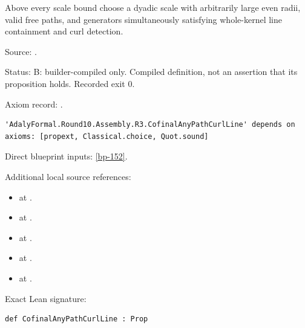 \begin{definition}[bp-163]
\label{bp-163}
\leanok
Above every scale bound choose a dyadic scale with arbitrarily large even radii, valid free paths, and generators simultaneously satisfying whole-kernel line containment and curl detection.

\par Source: \texttt{}.
\par Status: B: builder-compiled only. Compiled definition, not an assertion that its proposition holds. Recorded exit 0.
\par Axiom record: \texttt{}.
\begin{verbatim}
'AdalyFormal.Round10.Assembly.R3.CofinalAnyPathCurlLine' depends on axioms: [propext, Classical.choice, Quot.sound]
\end{verbatim}
\par Direct blueprint inputs: \ref{bp-152}.
\par Additional local source references:
\begin{itemize}
\item \texttt{} at \texttt{}.
\item \texttt{} at \texttt{}.
\item \texttt{} at \texttt{}.
\item \texttt{} at \texttt{}.
\item \texttt{} at \texttt{}.
\end{itemize}
\par Exact Lean signature:
\begin{verbatim}
def CofinalAnyPathCurlLine : Prop
\end{verbatim}
\end{definition}

